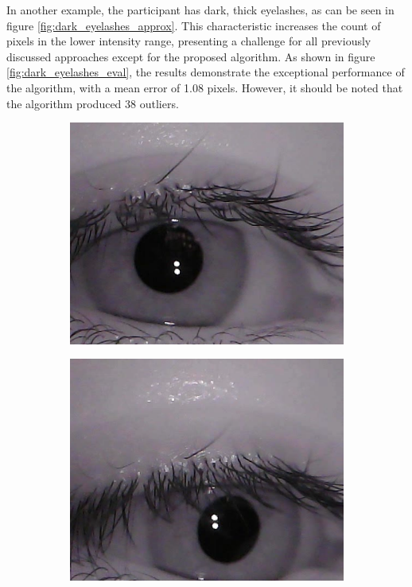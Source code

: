 In another example, the participant has dark, thick eyelashes, as can be seen in figure \ref{fig:dark_eyelashes_approx}. This characteristic increases the count of pixels in the lower intensity range, presenting a challenge for all previously discussed approaches except for the proposed algorithm. As shown in figure \ref{fig:dark_eyelashes_eval}, the results demonstrate the exceptional performance of the algorithm, with a mean error of 1.08 pixels. However, it should be noted that the algorithm produced 38 outliers. 
\begin{figure}[h]
    \centering
    \begin{subfigure}{0.4\textwidth}
        \centering
        \includegraphics[width=0.8\linewidth]{plots/makeup.png} 
    \end{subfigure}
    \begin{subfigure}{0.4\textwidth}
        \centering
        \includegraphics[width=0.8\linewidth]{plots/makeup2.png} 

\end{subfigure}
\end{figure}
